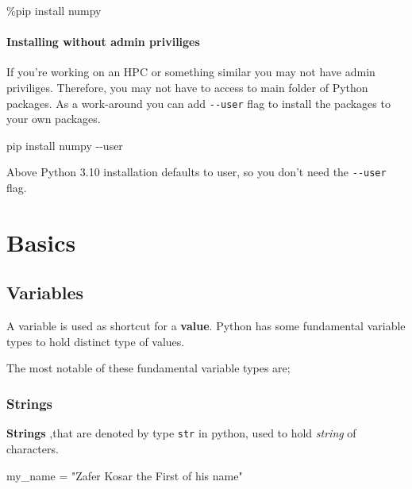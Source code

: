 \documentclass[
  letterpaper,
  DIV=11,
  numbers=noendperiod]{scrreprt}
\newenvironment{Shaded}{\begin{snugshade}}{\end{snugshade}}
\newcommand{\NormalTok}[1]{\textcolor[rgb]{0.00,0.23,0.31}{#1}}
\newcommand{\OperatorTok}[1]{\textcolor[rgb]{0.37,0.37,0.37}{#1}}
\newcommand{\StringTok}[1]{\textcolor[rgb]{0.13,0.47,0.30}{#1}}
\begin{document}
\begin{Shaded}
\begin{Highlighting}[]
\OperatorTok{\%}\NormalTok{pip install numpy}
\end{Highlighting}
\end{Shaded}

\subsection{Installing without admin
priviliges}\label{installing-without-admin-priviliges}

If you're working on an HPC or something similar you may not have admin
priviliges. Therefore, you may not have to access to main folder of
Python packages. As a work-around you can add \texttt{-\/-user} flag to
install the packages to your own packages.

\begin{Shaded}
\begin{Highlighting}[]
\NormalTok{pip install numpy {-}{-}user}
\end{Highlighting}
\end{Shaded}

Above Python 3.10 installation defaults to user, so you don't need the
\texttt{-\/-user} flag.

\part{Basics}

\chapter{Variables}\label{variables}

A variable is used as shortcut for a \textbf{value}. Python has some
fundamental variable types to hold distinct type of values.

The most notable of these fundamental variable types are;

\section{Strings}\label{strings}

\textbf{Strings} ,that are denoted by type \texttt{str} in python, used
to hold \emph{string} of characters.

\begin{Shaded}
\begin{Highlighting}[]
\NormalTok{my\_name }\OperatorTok{=} \StringTok{"Zafer Kosar the First of his name"}
\end{Highlighting}
\end{Shaded}
\end{document}
